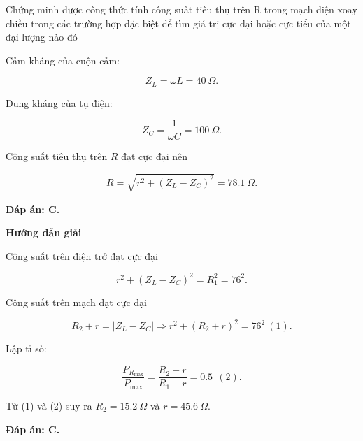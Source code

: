 \begin{dang}{Chứng minh được công thức tính công suất tiêu thụ trên R trong mạch điện xoay chiều trong các trường hợp đặc biệt để tìm giá trị cực đại hoặc cực tiểu của một đại lượng nào đó}
{		Cảm kháng của cuộn cảm:
		
		$$Z_L =\omega L = \SI{40}{\Omega}.$$
		
		Dung kháng của tụ điện:
		
		$$Z_C = \dfrac{1}{\omega C} = \SI{100}{\Omega}.$$
		
		Công suất tiêu thụ trên $R$ đạt cực đại nên 
		
		$$ R = \sqrt{r^2 + (Z_L-Z_C)^2} =\SI{78,1}{\Omega}.$$
		
		\textbf{Đáp án: C.}
	}
	
	
	
	{\begin{center}
			\textbf{Hướng dẫn giải}
		\end{center}
		
		Công suất trên điện trở đạt cực đại
		
		$$r^2 +(Z_L-Z_C)^2 =R_1^2 = 76^2.$$
		
		Công suất trên mạch đạt cực đại
		
		$$ R_2 + r = |Z_L-Z_C| \Rightarrow r^2 +(R_2+r)^2 =76^2\ (1).$$
		
		Lập tỉ số:
		
		$$\dfrac{P_{R_\text{max}}}{P_\text{max}} = \dfrac{R_2+r}{R_1+r} = \SI{0,5}{}\ (2).$$
		
		Từ (1) và (2) suy ra $R_2 = \SI{15,2}{\Omega}$ và $r = \SI{45,6}{\Omega}.$
		
		
		\textbf{Đáp án: C.}
		
	}
	
	
\end{dang}
